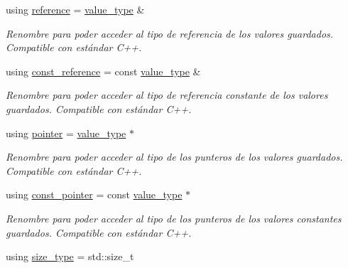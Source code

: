 \begin{DoxyCompactItemize}
using \hyperlink{classaed2_1_1map_af4f147533b3c0207ab036c86ce13ec0d}{reference} = \hyperlink{classaed2_1_1map_a719db98e0ff9a837610f76be33264680}{value\+\_\+type} \&
\begin{DoxyCompactList}\small\item\em Renombre para poder acceder al tipo de referencia de los valores guardados. Compatible con estándar C++. \end{DoxyCompactList}\item 
\mbox{\label{classaed2_1_1map_a277080d3db76f19df9319ecba16475a9}} 
using \hyperlink{classaed2_1_1map_a277080d3db76f19df9319ecba16475a9}{const\+\_\+reference} = const \hyperlink{classaed2_1_1map_a719db98e0ff9a837610f76be33264680}{value\+\_\+type} \&
\begin{DoxyCompactList}\small\item\em Renombre para poder acceder al tipo de referencia constante de los valores guardados. Compatible con estándar C++. \end{DoxyCompactList}\item 
\mbox{\label{classaed2_1_1map_a7394e98a23b86bc008ad73326b273fd5}} 
using \hyperlink{classaed2_1_1map_a7394e98a23b86bc008ad73326b273fd5}{pointer} = \hyperlink{classaed2_1_1map_a719db98e0ff9a837610f76be33264680}{value\+\_\+type} $\ast$
\begin{DoxyCompactList}\small\item\em Renombre para poder acceder al tipo de los punteros de los valores guardados. Compatible con estándar C++. \end{DoxyCompactList}\item 
\mbox{\label{classaed2_1_1map_a1366fc3e227a49777cb748fc6d4e022b}} 
using \hyperlink{classaed2_1_1map_a1366fc3e227a49777cb748fc6d4e022b}{const\+\_\+pointer} = const \hyperlink{classaed2_1_1map_a719db98e0ff9a837610f76be33264680}{value\+\_\+type} $\ast$
\begin{DoxyCompactList}\small\item\em Renombre para poder acceder al tipo de los punteros de los valores constantes guardados. Compatible con estándar C++. \end{DoxyCompactList}\item 
\mbox{\label{classaed2_1_1map_a8cf1c570f605e9c0ad6feb8ce12c9400}} 
using \hyperlink{classaed2_1_1map_a8cf1c570f605e9c0ad6feb8ce12c9400}{size\+\_\+type} = std\+::size\+\_\+t

\end{DoxyCompactItemize}
